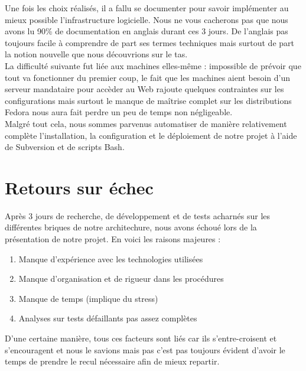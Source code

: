 \documentclass[11pt,a4paper]{report}
\begin{document}
            Une fois les choix réalisés, il a fallu se documenter pour savoir implémenter au mieux possible l'infrastructure logicielle. Nous ne vous cacherons pas que nous avons lu 90\% de documentation en anglais durant ces 3 jours. De l'anglais pas toujours facile à comprendre de part ses termes techniques mais surtout de part la notion nouvelle que nous découvrions sur le tas.\\
            
            La difficulté suivante fut liée aux machines elles-même : impossible de prévoir que tout va fonctionner du premier coup, le fait que les machines aient besoin d'un serveur mandataire pour accèder au Web rajoute quelques contraintes sur les configurations mais surtout le manque de maîtrise complet sur les distributions Fedora nous aura fait perdre un peu de temps non négligeable.\\
            
            Malgré tout cela, nous sommes parvenus automatiser de manière relativement complète l'installation, la configuration et le déploiement de notre projet à l'aide de Subversion et de scripts Bash.
            
        \section{Retours sur échec}
            
            Après 3 jours de recherche, de développement et de tests acharnés sur les différentes briques de notre architechure, nous avons échoué lors de la présentation de notre projet. En voici les raisons majeures :\\
            
            \begin{enumerate}
                \item Manque d'expérience avec les technologies utilisées
                \item Manque d'organisation et de rigueur dans les procédures
                \item Manque de temps (implique du stress)
                \item Analyses sur tests défaillants pas assez complètes
            \end{enumerate}
            
            D'une certaine manière, tous ces facteurs sont liés car ils s'entre-croisent et s'encouragent et nous le savions mais pas c'est pas toujours évident d'avoir le temps de prendre le recul nécessaire afin de mieux repartir.\\
            
\end{document}
